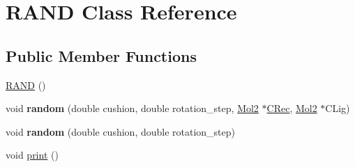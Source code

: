 \hypertarget{classRAND}{
\section{RAND Class Reference}
\label{classRAND}
}
\subsection*{Public Member Functions}
\begin{DoxyCompactItemize}
\item 
\hyperlink{classRAND_a9a7b436daf559318824a9c4b2d534a26}{RAND} ()
\item 
\hypertarget{classRAND_aa20e1fa47ca5abac48189de972937a1d}{
void {\bfseries random} (double cushion, double rotation\_\-step, \hyperlink{classMol2}{Mol2} $\ast$\hyperlink{classRAND_aa5e637e9e5d6795687fc8a24af274500}{CRec}, \hyperlink{classMol2}{Mol2} $\ast$CLig)}
\label{classRAND_aa20e1fa47ca5abac48189de972937a1d}

\item 
\hypertarget{classRAND_a107db221d21c19cadc8053abec26c5f5}{
void {\bfseries random} (double cushion, double rotation\_\-step)}
\label{classRAND_a107db221d21c19cadc8053abec26c5f5}

\item 
void \hyperlink{classRAND_a2b19a2b6cc533fb1e0858cb3059701c1}{print} ()
\end{DoxyCompactItemize}
